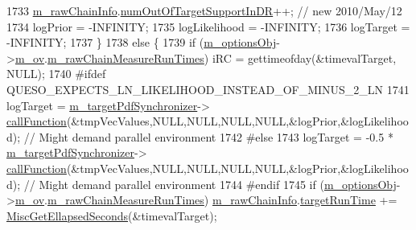 \begin{DoxyCode}
1733             \hyperlink{class_q_u_e_s_o_1_1_metropolis_hastings_s_g_ac531509489028853bb17c0353fc9eafd}{m\_rawChainInfo}.\hyperlink{struct_q_u_e_s_o_1_1_m_h_raw_chain_info_struct_a783bb6c6b6dcab7f2bcc9fd0f49c588f}{numOutOfTargetSupportInDR}++; \textcolor{comment}{// new
       2010/May/12}
1734             logPrior      = -INFINITY;
1735             logLikelihood = -INFINITY;
1736             logTarget     = -INFINITY;
1737           \}
1738           \textcolor{keywordflow}{else} \{
1739             \textcolor{keywordflow}{if} (\hyperlink{class_q_u_e_s_o_1_1_metropolis_hastings_s_g_a5d0bc9f73d50d272aa6bfb5ef5939ef3}{m\_optionsObj}->\hyperlink{class_q_u_e_s_o_1_1_metropolis_hastings_s_g_options_a9d4792d9fc2dc5439b8ab489b0c236eb}{m\_ov}.\hyperlink{class_q_u_e_s_o_1_1_mh_options_values_a6fcc2efc9146b68548e62d707aeed883}{m\_rawChainMeasureRunTimes}) iRC 
      = gettimeofday(&timevalTarget, NULL);
1740 \textcolor{preprocessor}{#ifdef QUESO\_EXPECTS\_LN\_LIKELIHOOD\_INSTEAD\_OF\_MINUS\_2\_LN}
1741 \textcolor{preprocessor}{}            logTarget =        \hyperlink{class_q_u_e_s_o_1_1_metropolis_hastings_s_g_ae7c7551764e0ccdfbe2862c544cdab10}{m\_targetPdfSynchronizer}->
      \hyperlink{class_q_u_e_s_o_1_1_scalar_function_synchronizer_adcdc70486ac64c11d0e505c4fb590a6b}{callFunction}(&tmpVecValues,NULL,NULL,NULL,NULL,&logPrior,&logLikelihood); \textcolor{comment}{// Might demand
       parallel environment}
1742 \textcolor{preprocessor}{#else}
1743 \textcolor{preprocessor}{}            logTarget = -0.5 * \hyperlink{class_q_u_e_s_o_1_1_metropolis_hastings_s_g_ae7c7551764e0ccdfbe2862c544cdab10}{m\_targetPdfSynchronizer}->
      \hyperlink{class_q_u_e_s_o_1_1_scalar_function_synchronizer_adcdc70486ac64c11d0e505c4fb590a6b}{callFunction}(&tmpVecValues,NULL,NULL,NULL,NULL,&logPrior,&logLikelihood); \textcolor{comment}{// Might demand
       parallel environment}
1744 \textcolor{preprocessor}{#endif}
1745 \textcolor{preprocessor}{}            \textcolor{keywordflow}{if} (\hyperlink{class_q_u_e_s_o_1_1_metropolis_hastings_s_g_a5d0bc9f73d50d272aa6bfb5ef5939ef3}{m\_optionsObj}->\hyperlink{class_q_u_e_s_o_1_1_metropolis_hastings_s_g_options_a9d4792d9fc2dc5439b8ab489b0c236eb}{m\_ov}.\hyperlink{class_q_u_e_s_o_1_1_mh_options_values_a6fcc2efc9146b68548e62d707aeed883}{m\_rawChainMeasureRunTimes}) 
      \hyperlink{class_q_u_e_s_o_1_1_metropolis_hastings_s_g_ac531509489028853bb17c0353fc9eafd}{m\_rawChainInfo}.\hyperlink{struct_q_u_e_s_o_1_1_m_h_raw_chain_info_struct_ab230db8f99e46f0c1e4fc6c2aa3773eb}{targetRunTime} += 
      \hyperlink{namespace_q_u_e_s_o_a424bc33f2e6e287fd468408d14b772ee}{MiscGetEllapsedSeconds}(&timevalTarget);

\end{DoxyCode}
